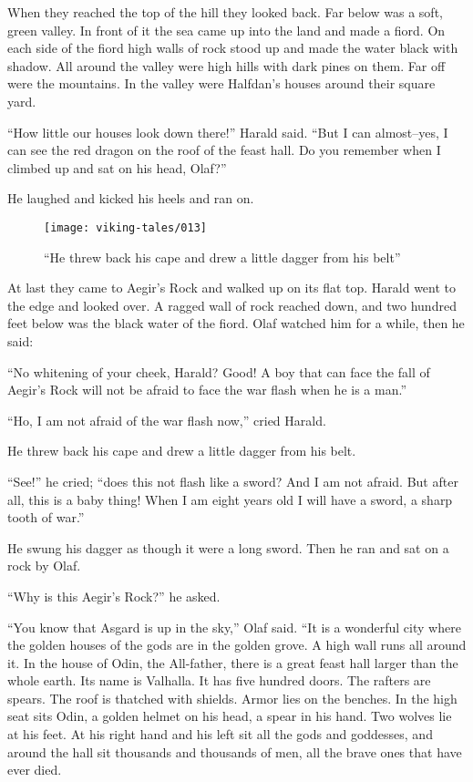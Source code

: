 When they reached the top of the hill they looked back. Far below was a
soft, green valley. In front of it the sea came up into the land and
made a fiord. On each side of the fiord high walls of rock stood up and
made the water black with shadow. All around the valley were high hills
with dark pines on them. Far off were the mountains. In the valley were
Halfdan's houses around their square yard.

``How little our houses look down there!'' Harald said. ``But I can
almost--yes, I can see the red dragon on the roof of the feast hall. Do
you remember when I climbed up and sat on his head, Olaf?''

He laughed and kicked his heels and ran on.

\begin{figure}[ht]
    \centering
    \texttt{[image: viking-tales/013]}
    \caption{
        ``He threw back his cape and drew a little dagger from his
        belt''}
\end{figure}

At last they came to Aegir's Rock and walked up on its flat top. Harald
went to the edge and looked over. A ragged wall of rock reached down,
and two hundred feet below was the black water of the fiord. Olaf
watched him for a while, then he said:

``No whitening of your cheek, Harald? Good! A boy that can face the fall
of Aegir's Rock will not be afraid to face the war flash when he is a
man.''

``Ho, I am not afraid of the war flash now,'' cried Harald.

He threw back his cape and drew a little dagger from his belt.

``See!'' he cried; ``does this not flash like a sword? And I am not
afraid. But after all, this is a baby thing! When I am eight years old I
will have a sword, a sharp tooth of war.''

He swung his dagger as though it were a long sword. Then he ran and sat
on a rock by Olaf.

``Why is this Aegir's Rock?'' he asked.

``You know that Asgard is up in the sky,'' Olaf said. ``It is a wonderful
city where the golden houses of the gods are in the golden grove. A high
wall runs all around it. In the house of Odin, the All-father, there is
a great feast hall larger than the whole earth. Its name is Valhalla. It
has five hundred doors. The rafters are spears. The roof is thatched
with shields. Armor lies on the benches. In the high seat sits Odin, a
golden helmet on his head, a spear in his hand. Two wolves lie at his
feet. At his right hand and his left sit all the gods and goddesses, and
around the hall sit thousands and thousands of men, all the brave ones
that have ever died.


